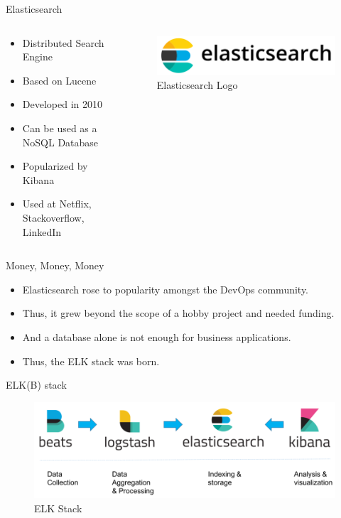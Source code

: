 \documentclass[compress,aspectratio=169]{beamer}
\begin{document}
\begin{frame}{Elasticsearch}
\begin{columns}[T]
\begin{column}{0.5\textwidth}
\begin{itemize}
  \item Distributed Search Engine
  \item Based on Lucene
  \item Developed in 2010
  \item Can be used as a NoSQL Database
  \item Popularized by Kibana
  \item Used at Netflix, Stackoverflow, LinkedIn
\end{itemize}
\end{column}
\begin{column}{0.5\textwidth}
\begin{figure}
  \includegraphics[width=\textwidth]{elasticsearch.png}
  \caption{Elasticsearch Logo}
\end{figure}
\end{column}
\end{columns}
\end{frame}

\begin{frame}{Money, Money, Money}
\begin{itemize}
  \item Elasticsearch rose to popularity amongst the DevOps community.
  \item Thus, it grew beyond the scope of a hobby project and needed funding.
  \item And a database alone is not enough for business applications.
  \item Thus, the ELK stack was born.
\end{itemize}
\end{frame}

\begin{frame}{ELK(B) stack}
\begin{center}
\begin{figure}
  \includegraphics[width=\textwidth]{elk.png}
  \caption{ELK Stack}
\end{figure}
\end{center}
\end{frame}
\end{document}
